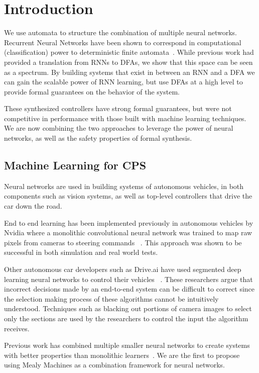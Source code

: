\section{Introduction}


We use automata to structure the combination of multiple neural networks.
Recurrent Neural Networks have been shown to correspond in computational (classification) power to deterministic finite automata~\cite{tino1998finite}.
While previous work had provided a translation from RNNs to DFAs, we show that this space can be seen as a spectrum.
By building systems that exist in between an RNN and a DFA we can gain the scalable power of RNN learning, but use DFAs at a high level to provide formal guarantees on the behavior of the system.

These synthesized controllers have strong formal guarantees, but were not competitive in performance with those built with machine learning techniques. We are now combining the two approaches to leverage the power of neural networks, as well as the safety properties of formal synthesis.

\subsection{Machine Learning for CPS}

Neural networks are used in building systems of autonomous vehicles, in both components such as vision systems, as well as top-level controllers that drive the car down the road.

End to end learning has been implemented previously in autonomous vehicles by Nvidia where a monolithic convolutional neural network was trained to map raw pixels from cameras to steering commands ~\cite{parallelforall}. This approach was shown to be successful in both simulation and real world tests.

Other autonomous car developers such as Drive.ai have used segmented deep learning neural networks to control their vehicles ~\cite{}. These researchers argue that incorrect decisions made by an end-to-end system can be difficult to correct since the selection making process of these algorithms cannot be intuitively understood. Techniques such as blacking out portions of camera images to select only the sections are used by the researchers to control the input the algorithm receives. 


Previous work has combined multiple smaller neural networks to create systems with better properties than monolithic learners~\cite{masoudnia2014mixture,baldacchino2016variational}.
We are the first to propose using Mealy Machines as a combination framework for neural networks.

